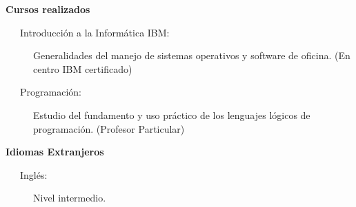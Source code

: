 \documentclass[a4paper,11pt]{article}
\newcommand{\resheading}[1]{{\large \colorbox{mygrey}{\begin{minipage}{\textwidth}{\textbf{#1 \vphantom{p\^{E}}}}\end{minipage}}}}
\begin{document}

\resheading{ Cursos realizados }
	\begin{description}
		\item[\ \ \ Introducci\'on a la Inform\'atica IBM:] { \footnotesize Generalidades del manejo de sistemas operativos y software de oficina. (En centro IBM certificado) }
		\item[\ \ \ Programaci\'on:] { \footnotesize Estudio del fundamento y uso pr\'actico de los lenguajes l\'ogicos de programaci\'on. (Profesor Particular) }
	\end{description}


\resheading{ Idiomas Extranjeros }
	\begin{description}
		\item[\ \ \ Ingl\'es:] { \footnotesize Nivel intermedio. }
	\end{description}
\end{document}
